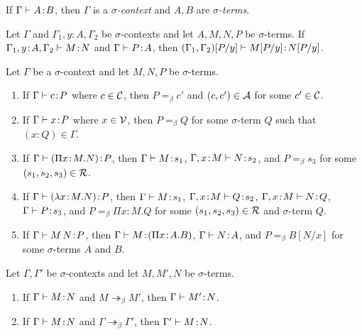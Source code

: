 \documentclass[reqno, twoside]{article}
\begin{document}
    \begin{definition}
        If $\Gamma\vdash A\!:\!B$, then $\Gamma$ is a \textit{$\sigma$-context} and $A,B$ are \textit{$\sigma$-terms}.
    \end{definition}

    \begin{lemma}\label{lem:substitution}
        Let $\Gamma$ and $\Gamma_1,y\!:\!A,\Gamma_2$ be $\sigma$-contexts and let $A,M,N,P$ be $\sigma$-terms. If $\Gamma_1,y\!:\!A,\Gamma_2\vdash M\!:\!N$ and $\Gamma\vdash P\!:\!A$, then $(\Gamma_1,\Gamma_2)[P/y]\vdash M[P/y]\!:\!N[P/y]$.
    \end{lemma}

    \begin{lemma}\label{lem:stripping}
        Let $\Gamma$ be a $\sigma$-context and let $M,N,P$ be $\sigma$-terms.
        \begin{enumerate}
            \item If $\Gamma\vdash c\!:\!P$ where $c\in\mathcal{C}$, then $P=_\beta c'$ and $(c,c')\in\mathcal{A}$ for some $c'\in\mathcal{C}$.
                \vspace{-0.05in}
            \item If $\Gamma\vdash x\!:\!P$ where $x\in\mathcal{V}$, then $P=_\beta Q$ for some $\sigma$-term $Q$ such that $(x\!:\!Q)\in\Gamma$.
                \vspace{-0.05in}
            \item If $\Gamma\vdash(\Pi x\!:\!M.N)\!:\!P$, then $\Gamma\vdash M\!:\!s_1$, $\Gamma,x\!:\!M\vdash N\!:\!s_2$, and $P=_\beta s_3$ for some $(s_1,s_2,s_3)\in\mathcal{R}$.
                \vspace{-0.05in}
            \item If $\Gamma\vdash(\lambda x\!:\!M.N)\!:\!P$, then $\Gamma\vdash M\!:\!s_1$, $\Gamma,x\!:\!M\vdash Q\!:\!s_2$, $\Gamma,x\!:\!M\vdash N\!:\!Q$, $\Gamma\vdash P\!:\!s_3$, and $P=_\beta\Pi x\!:\! M.Q$ for some $(s_1,s_2,s_3)\in\mathcal{R}$ and $\sigma$-term $Q$.
                \vspace{-0.05in}
            \item If $\Gamma\vdash M\,N\!:\!P$, then $\Gamma\vdash M\!:\!(\Pi x\!:\!A.B)$, $\Gamma\vdash N\!:\!A$, and $P=_\beta B[N/x]$ for some $\sigma$-terms $A$ and $B$.
        \end{enumerate}
    \end{lemma}

    \begin{theorem}
        Let $\Gamma,\Gamma'$ be $\sigma$-contexts and let $M,M',N$ be $\sigma$-terms.
        \begin{enumerate}
            \item If $\Gamma\vdash M\!:\!N$ and $M\twoheadrightarrow_\beta M'$, then $\Gamma\vdash M'\!:\! N$.
                \vspace{-0.05in}
            \item If $\Gamma\vdash M\!:\!N$ and $\Gamma\twoheadrightarrow_\beta\Gamma'$, then $\Gamma'\vdash M\!:\! N$.
        \end{enumerate}
    \end{theorem}
\end{document}
